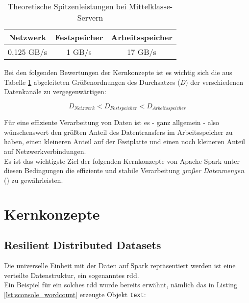 \begin{table}[ht]
	\centering %
	\begin{tabular}{c c c} %
		\hline\hline %
		Netzwerk & Festspeicher & Arbeitsspeicher\\ [0.5ex] %
		\hline %
		0,125 GB/s & 1 GB/s & 17 GB/s \\ %
		\hline %
	\end{tabular}
	\caption{Theoretische Spitzenleistungen bei Mittelklasse-Servern} %
	\label{table:vgldurchsatz} %
\end{table}

Bei den folgenden Bewertungen der Kernkonzepte ist es wichtig sich die aus Tabelle \ref{table:vgldurchsatz} abgeleiteten Größenordnungen des Durchsatzes (\textit{D}) der verschiedenen Datenkanäle zu vergegenwärtigen:

\begin{equation*}
	D_{Netzwerk} < D_{Festspeicher} < D_{Arbeitsspeicher}
\end{equation*}

Für eine effiziente Verarbeitung von Daten ist es - ganz allgemein - also wünschenswert den größten Anteil des Datentransfers im Arbeitsspeicher zu haben, einen kleineren Anteil auf der Festplatte und einen noch kleineren Anteil auf Netzwerkverbindungen.\\

Es ist das wichtigste Ziel der folgenden Kernkonzepte von Apache Spark unter diesen Bedingungen die effiziente und stabile Verarbeitung \textit{großer Datenmengen} (\cite{Sam14}) zu gewährleisten.\\

\section{Kernkonzepte}

\subsection{Resilient Distributed Datasets}
Die universelle Einheit mit der Daten auf Spark repräsentiert werden ist eine verteilte Datenstruktur, ein sogenanntes \gls{rdd}\cite{Mat12}.\\

Ein Beispiel für ein solches \gls{rdd} wurde bereits erwähnt, nämlich das in Listing \ref{lst:sconsole_wordcount} erzeugte Objekt \lstinline|text|:\\

